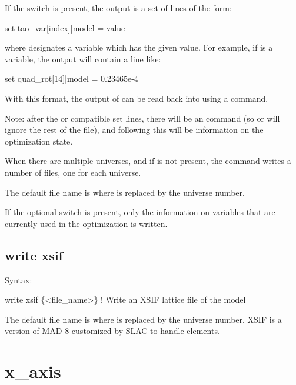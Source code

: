 {{{{{{{{{{{If the  switch is present, the output is a set of lines of the form:
\begin{example}
  set tao_var[index]|model = value
\end{example}
where  designates a \tao variable which has the given  value. For
example, if  is a \tao variable, the output
will contain a line like:
\begin{example}
  set quad_rot[14]|model = 0.23465e-4
\end{example}
With this format, the output of  can be read back into \tao using a 
command.

Note: after the \bmad or \tao compatible set lines, there will be an  command (so \bmad
or \tao will ignore the rest of the file), and following this will be information on the
optimization state.

When there are multiple universes, and if  is not present, the 
command writes a number of files, one for each universe.

The default file name is  where \vn{\#} is replaced by the universe number. 

If the optional  switch is present, only the information on variables that are
currently used in the optimization is written.


\subsection{write xsif}
\label{s:write.xsif}

Syntax:
\begin{example}
    write xsif \{<file_name>\}  ! Write an XSIF lattice file of the model
\end{example}

The default file name is  where \vn{\#} is replaced by the universe number. XSIF is
a version of MAD-8 customized by SLAC to handle  elements.


\section{x_axis}
\label{s:x.axis}

}}}}}}}}}}}
